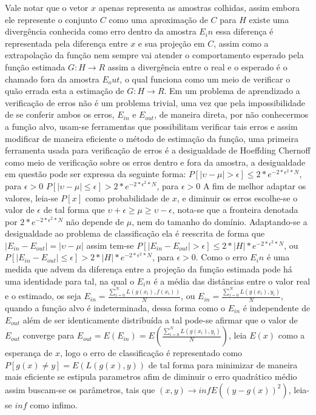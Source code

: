 \documentclass[pfc]{imetex}
\begin{document}
    \newline
    Vale notar que o vetor $x$ apenas representa as amostras colhidas, assim embora ele represente o conjunto $C$ como uma aproximação de $C$ para $H$ existe uma divergência conhecida como erro dentro da amostra $E_in$ essa diferença é representada pela diferença entre $x$ e sua projeção em $C$, assim como a extrapolação da função nem sempre vai atender o comportamento esperado pela função estimada $G: H \rightarrow R$ assim a divergência entre o real e o esperado é o chamado fora da amostra $E_out$, o qual funciona como um meio de verificar o quão errada esta a estimação de $G: H \rightarrow R$.
    \newline
    Em um problema de aprendizado a verificação de erros não é um problema trivial, uma vez que pela impossibilidade de se conferir ambos os erros, $E_{in}$ e $E_{out}$, de maneira direta, por não conhecermos a função alvo, usam-se ferramentas que possibilitam verificar tais erros e assim modificar de maneira eficiente o método de estimação da função, uma primeira ferramenta usada para verificação de erros é a desigualdade de Hoeffding Chernoff como meio de verificação sobre os erros dentro e fora da amostra, a desigualdade em questão pode ser expressa da seguinte forma:
    \newline
    $P[|\upsilon - \mu|>\epsilon] \leq 2*e^{-2*\epsilon^2*N}$, para $\epsilon>0$
    \newline
    $P[|\upsilon - \mu|\leq\epsilon] > 2*e^{-2*\epsilon^2*N}$, para $\epsilon>0$
    \newline
    A fim de melhor adaptar os valores, leia-se $P[x]$ como probabilidade de $x$, e diminuir os erros escolhe-se o valor de $\epsilon$ de tal forma que $\upsilon + \epsilon \geq \mu \geq \upsilon - \epsilon$, nota-se que a fronteira denotada por $2*e^{-2*\epsilon^2*N}$ não depende de $\mu$, nem do tamanho do domínio.
    \newline
    Adaptando-se a desigualdade ao problema de classificação ela é reescrita de forma que $|E_{in}-E_{out}|=|\upsilon-\mu|$ assim tem-se
    $P[|E_{in}-E_{out}|>\epsilon] \leq 2*|H|*e^{-2*\epsilon^2*N}$, ou 
    $P[|E_{in}-E_{out}|\leq\epsilon] > 2*|H|*e^{-2*\epsilon^2*N}$, para $\epsilon>0$.
    \newline
    Como o erro $E_in$ é uma medida que advem da diferença entre a projeção da função estimada pode há uma identidade para tal, na qual o $E_in$ é a média das distâncias entre o valor real e o estimado, os seja $E_{in} = \frac{\sum\limits_{i=0}^N L(g(x_i),f(x_i))}{N}$, ou $E_{in} = \frac{\sum\limits_{i=0}^N L(g(x_i),y_i)}{N}$, quando a função alvo é indeterminada, dessa forma como o $E_{in}$ é independente de $E_{out}$ além de ser identicamente distribuída a tal pode-se afirmar que o valor de $E_{out}$ converge para $E_{out} = E(E_{in}) = E(\frac{\sum\limits_{i=0}^N L(g(x_i),y_i)}{N})$, leia $E(x)$ como a esperança de $x$, logo o erro de classificação é representado como $P[g(x) \neq y] = E(L(g(x),y))$ de tal forma para minimizar de maneira mais eficiente se estipula parametros afim de diminuir o erro quadrático médio assim buscam-se os parâmetros, tais que $(x, y) \rightarrow inf E((y-g(x))^2)$, leia-se $inf$ como infimo.
\label{fundamentaca}
\end{document}
